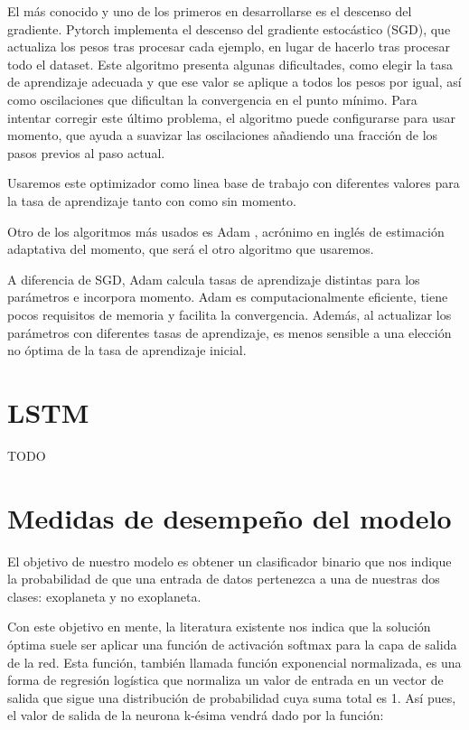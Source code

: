 El más conocido y uno de los primeros en desarrollarse es el descenso
del gradiente. Pytorch implementa el descenso del gradiente estocástico
(SGD), que actualiza los pesos tras procesar cada ejemplo, en lugar de
hacerlo tras procesar todo el dataset. Este algoritmo presenta algunas
dificultades, como elegir la tasa de aprendizaje adecuada y que ese
valor se aplique a todos los pesos por igual, así como oscilaciones que
dificultan la convergencia en el punto mínimo. Para intentar corregir
este último problema, el algoritmo puede configurarse para usar momento,
que ayuda a suavizar las oscilaciones añadiendo una fracción de los
pasos previos al paso actual.

Usaremos este optimizador como linea base de trabajo con diferentes
valores para la tasa de aprendizaje tanto con como sin momento.

Otro de los algoritmos más usados es Adam \cite{2014arXiv1412.6980K}, acrónimo en inglés de
estimación adaptativa del momento, que será el otro algoritmo que
usaremos.

A diferencia de SGD, Adam calcula tasas de aprendizaje distintas para
los parámetros e incorpora momento. Adam es computacionalmente
eficiente, tiene pocos requisitos de memoria y facilita la convergencia.
Además, al actualizar los parámetros con diferentes tasas de
aprendizaje, es menos sensible a una elección no óptima de la tasa de
aprendizaje inicial.

\section{LSTM}\label{sec:lstm}
TODO

\section{Medidas de desempeño del modelo}\label{sec:metricas}

El objetivo de nuestro modelo es obtener un clasificador binario que nos
indique la probabilidad de que una entrada de datos pertenezca a una de
nuestras dos clases: exoplaneta y no exoplaneta.

Con este objetivo en mente, la literatura existente nos indica que la
solución óptima suele ser aplicar una función de activación softmax para
la capa de salida de la red. Esta función, también llamada función
exponencial normalizada, es una forma de regresión logística que
normaliza un valor de entrada en un vector de salida que sigue una
distribución de probabilidad cuya suma total es 1. Así pues, el valor de
salida de la neurona k-ésima vendrá dado por la función:

